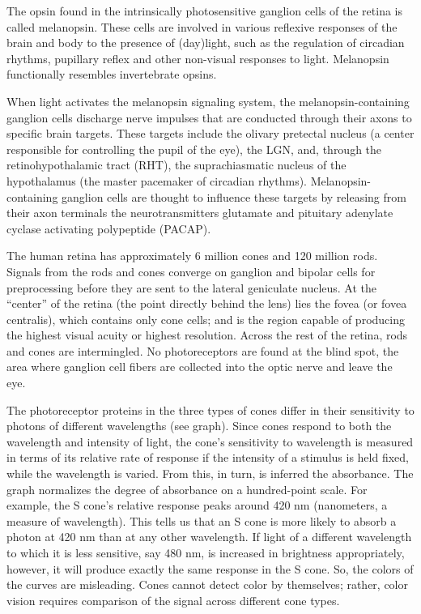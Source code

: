 \documentclass[]{book}
\begin{document}
The opsin found in the intrinsically photosensitive ganglion cells of the retina is called melanopsin. These cells are involved in various reflexive responses of the brain and body to the presence of (day)light, such as the regulation of circadian rhythms, pupillary reflex and other non-visual responses to light. Melanopsin functionally resembles invertebrate opsins.

When light activates the melanopsin signaling system, the melanopsin-containing ganglion cells discharge nerve impulses that are conducted through their axons to specific brain targets. These targets include the olivary pretectal nucleus (a center responsible for controlling the pupil of the eye), the LGN, and, through the retinohypothalamic tract (RHT), the suprachiasmatic nucleus of the hypothalamus (the master pacemaker of circadian rhythms). Melanopsin-containing ganglion cells are thought to influence these targets by releasing from their axon terminals the neurotransmitters glutamate and pituitary adenylate cyclase activating polypeptide (PACAP).

The human retina has approximately 6 million cones and 120 million rods. Signals from the rods and cones converge on ganglion and bipolar cells for preprocessing before they are sent to the lateral geniculate nucleus. At the ``center'' of the retina (the point directly behind the lens) lies the fovea (or fovea centralis), which contains only cone cells; and is the region capable of producing the highest visual acuity or highest resolution. Across the rest of the retina, rods and cones are intermingled. No photoreceptors are found at the blind spot, the area where ganglion cell fibers are collected into the optic nerve and leave the eye.

The photoreceptor proteins in the three types of cones differ in their sensitivity to photons of different wavelengths (see graph). Since cones respond to both the wavelength and intensity of light, the cone's sensitivity to wavelength is measured in terms of its relative rate of response if the intensity of a stimulus is held fixed, while the wavelength is varied. From this, in turn, is inferred the absorbance. The graph normalizes the degree of absorbance on a hundred-point scale. For example, the S cone's relative response peaks around 420 nm (nanometers, a measure of wavelength). This tells us that an S cone is more likely to absorb a photon at 420 nm than at any other wavelength. If light of a different wavelength to which it is less sensitive, say 480 nm, is increased in brightness appropriately, however, it will produce exactly the same response in the S cone. So, the colors of the curves are misleading. Cones cannot detect color by themselves; rather, color vision requires comparison of the signal across different cone types.
\end{document}
